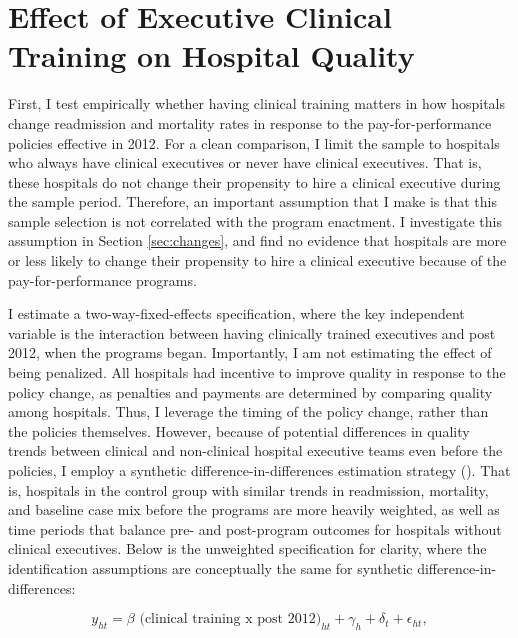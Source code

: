 \documentclass[12pt]{article}
\begin{document}
    \section{Effect of Executive Clinical Training on Hospital Quality}\label{sec:clinical}

    First, I test empirically whether having clinical training matters in how hospitals change readmission and mortality rates in response to the pay-for-performance policies effective in 2012. For a clean comparison, I limit the sample to hospitals who always have clinical executives or never have clinical executives. That is, these hospitals do not change their propensity to hire a clinical executive during the sample period. Therefore, an important assumption that I make is that this sample selection is not correlated with the program enactment. I investigate this assumption in Section \ref{sec:changes}, and find no evidence that hospitals are more or less likely to change their propensity to hire a clinical executive because of the pay-for-performance programs. 
    
    I estimate a two-way-fixed-effects specification, where the key independent variable is the interaction between having clinically trained executives and post 2012, when the programs began. Importantly, I am not estimating the effect of being penalized. All hospitals had incentive to improve quality in response to the policy change, as penalties and payments are determined by comparing quality among hospitals. Thus, I leverage the timing of the policy change, rather than the policies themselves. However, because of potential differences in quality trends between clinical and non-clinical hospital executive teams even before the policies, I employ a synthetic difference-in-differences estimation strategy (\cite{arkhangelsky2021synthetic}). That is, hospitals in the control group with similar trends in readmission, mortality, and baseline case mix before the programs are more heavily weighted, as well as time periods that balance pre- and post-program outcomes for hospitals without clinical executives. Below is the unweighted specification for clarity, where the identification assumptions are conceptually the same for synthetic difference-in-differences: 

    \begin{equation}
    \label{eq:clinical}
    y_{ht} = \beta \text{ (clinical training x post 2012)}_{ht} + \gamma_{h} + \delta_t + \epsilon_{ht},
    \end{equation}
    
\end{document}
